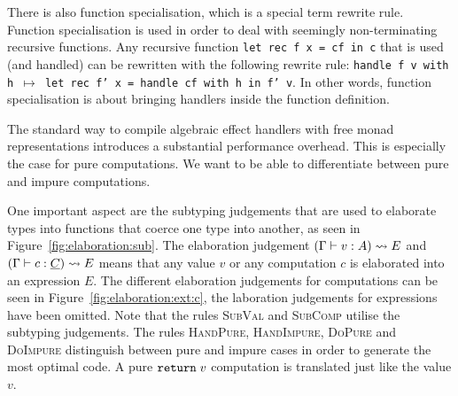 There is also function specialisation, which is a special term rewrite rule. Function specialisation is used in order to deal with seemingly non-terminating recursive functions. Any recursive function \texttt{let rec f x = cf in c} that is used (and handled) can be rewritten with the following rewrite rule: \texttt{handle f v with h $\mapsto$ let rec f' x = handle cf with h in f' v}. In other words, function specialisation is about bringing handlers inside the function definition.

The standard way to compile algebraic effect handlers with free monad representations introduces a substantial performance overhead. This is especially the case for pure computations. We want to be able to differentiate between pure and impure computations.

One important aspect are the subtyping judgements that are used to elaborate types into functions that coerce one type into another, as seen in Figure~\ref{fig:elaboration:sub}. The elaboration judgement $(\Gamma \vdash v : A) \leadsto E$ and $(\Gamma \vdash c : \underline{C}) \leadsto E$ means that any value $v$ or any computation $c$ is elaborated into an \ocaml expression $E$. The different elaboration judgements for computations can be seen in Figure~\ref{fig:elaboration:ext:c}, the laboration judgements for expressions have been omitted. Note that the rules \textsc{SubVal} and \textsc{SubComp} utilise the subtyping judgements. The rules \textsc{HandPure}, \textsc{HandImpure}, \textsc{DoPure} and \textsc{DoImpure} distinguish between pure and impure cases in order to generate the most optimal code. A pure $\mathtt{return}\; v$ computation is translated just like the value $v$.

